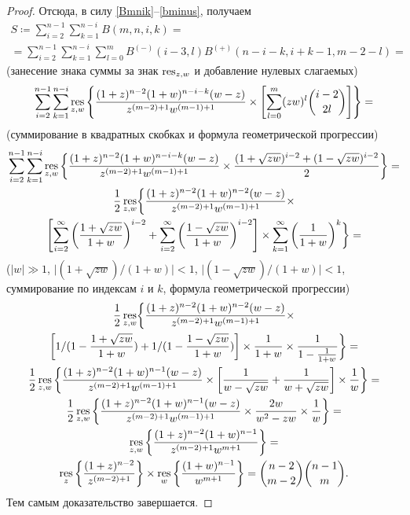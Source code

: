 \documentclass[a4paper,14pt,oneside,openany]{memoir}
\begin{document}
\begin{proof}
    Отсюда, в силу \eqref{Bmnik}--\eqref{bminus}, получаем
    \begin{gather*}
        S \coloneq \sum_{i=2}^{n-1}\sum_{k=1}^{n-i}B(m,n,i,k) = \\
        = \sum_{i=2}^{n-1}\sum_{k=1}^{n-i}\sum_{l=0}^{m}B^{(-)}(i-3, l)
        B^{(+)}(n-i-k, i+k-1, m-2-l) =
    \end{gather*}
    (занесение знака суммы за знак $\operatorname*{res}_{z,w}$ и добавление нулевых
    слагаемых)
    \begin{gather*}
        \sum_{i=2}^{n-1}\sum_{k=1}^{n-i}\operatorname*{res}_{z,w}\left\{
        \frac{(1+z)^{n-2}(1+w)^{n-i-k}(w-z)}{z^{(m-2)+1}w^{(m-1)+1}}
        \times \left[ \sum_{l=0}^{m}(zw)^l \binom{i-2}{2l} \right]\right\}=
    \end{gather*}
    (суммирование в квадратных скобках и формула геометрической
    прогрессии)
    \begin{gather*}
        \sum_{i=2}^{n-1}\sum_{k=1}^{n-i}\operatorname*{res}_{z,w}\left\{
        \frac{(1+z)^{n-2}(1+w)^{n-i-k}(w-z)}{z^{(m-2)+1}w^{(m-1)+1}}
        \times \frac{(1 + \sqrt{zw})^{i-2} + (1 - \sqrt{zw})^{i-2}}{2}
        \right\}
        = \\
        \frac{1}{2}\operatorname*{res}_{z,w} \biggl\{
        \frac{(1+z)^{n-2}(1+w)^{n-2}(w-z)}{z^{(m-2)+1}w^{(m-1)+1}} \times \\
        \left[ \sum_{i=2}^{\infty} \left(
        \frac{1+\sqrt{zw}}{1+w}\right)^{i-2} + \sum_{i=2}^{\infty} \left(
        \frac{1-\sqrt{zw}}{1+w}\right)^{i-2} \right] \times
        \sum_{k=1}^{\infty}\left(\frac{1}{1+w}\right)^k
        \biggr\} =
    \end{gather*}
    ($\lvert w\rvert \gg 1$, $\lvert (1 + \sqrt{zw})/(1+w)\rvert < 1$,
    $\lvert (1-\sqrt{zw})/(1+w) \rvert < 1$, суммирование по индексам
    $i$ и $k$, формула геометрической прогрессии)
    \begin{gather*}
        \frac{1}{2}\operatorname*{res}_{z,w}\biggl\{
        \frac{(1+z)^{n-2}(1+w)^{n-2}(w-z)}{z^{(m-2)+1}w^{(m-1)+1}} \times \\
        \left[ 1/(1 - \frac{1+ \sqrt{zw}}{1+w}) + 1 / (1 - \frac{1 -
            \sqrt{zw}}{1+w}) \right] \times \frac{1}{1+w} \times \frac{1}{1 -
            \frac{1}{1+w}}
        \biggr\} = \\
        \frac{1}{2}\operatorname*{res}_{z,w}\left\{
        \frac{(1+z)^{n-2}(1+w)^{n-1}(w-z)}{z^{(m-2)+1}w^{(m-1)+1}} \times
        \left[ \frac{1}{w-\sqrt{zw}} + \frac{1}{w + \sqrt{zw}} \right]
        \times \frac{1}{w}
        \right\} = \\
        \frac{1}{2}\operatorname*{res}_{z,w}\left\{
        \frac{(1+z)^{n-2}(1+w)^{n-1}(w-z)}{z^{(m-2)+1}w^{(m-1)+1}} \times
        \frac{2w}{w^2-zw} \times \frac{1}{w}
        \right\} = \\
        \operatorname*{res}_{z,w}\left\{
        \frac{(1+z)^{n-2}(1+w)^{n-1}}{z^{(m-2)+1}w^{m+1}} \right\} =
        \\
        \operatorname*{res}_{z}\left\{ \frac{(1+z)^{n-2}}{z^{(m-2)+1}} \right\} \times
        \operatorname*{res}_{w}\left\{ \frac{(1+w)^{n-1}}{w^{m+1}} \right\} =
        \binom{n-2}{m-2}\binom{n-1}{m}.
    \end{gather*}
    Тем самым доказательство  завершается.
\end{proof}
\end{document}
